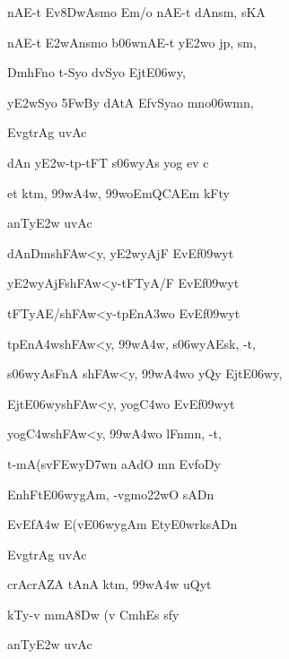 {\dn nAE-t Ev\38DwAsmo Em/o nAE-t dAnsm, sKA{\dandabdn} \dontdisplaylinenum}

{\dn nAE-t \3E2wAnsmo b\306wnA\0E-t y\3E2wo jp, sm, \vegdn\dontdisplaylinenum}

{\dn Dm\0hFno t-Syo d\?vSyo Ejt\?E\306wy,{\dandabdn} \dontdisplaylinenum}

{\dn y\3E2wSyo \35FwBy\2 dAtA EfvSyao mno\306wmn, \vegdn\dontdisplaylinenum}

{\dn EvgtrAg uvAc{\dandabdn}\dontdisplaylinenum }

{\dn dAn y\3E2w-tp-tFT{\rdt} s\2\306wyAs\2 yog ev c{\dandadn} \dontdisplaylinenum}

{\dn et\? ktm, \399w\?\3A4w, \399woEmQCAEm kFt\0y \vegdn\dontdisplaylinenum}

{\dn anT\0y\3E2w uvAc{\dandabdn}\dontdisplaylinenum }

{\dn dAnDm\0sh\3FAw\?<y, y\3E2wyAjF EvEf\309wyt\?{\dandadn} \dontdisplaylinenum}

{\dn y\3E2wyAjFsh\3FAw\?<y-tFT\0yA/F EvEf\309wyt\? \vegdn\dontdisplaylinenum}

{\dn tFT\0yAE/sh\3FAw\?<y-tpEn\3A3wo EvEf\309wyt\?{\dandabdn} \dontdisplaylinenum}

{\dn tpEn\3A4wsh\3FAw\?<y, \399w\?\3A4w, s\2\306wyAEsk, -t, \vegdn\dontdisplaylinenum}

{\dn s\2\306wyAsFnA\2 sh\3FAw\?<y, \399w\?\3A4wo yQy Ejt\?E\306wy,{\dandabdn} \dontdisplaylinenum}

{\dn Ejt\?E\306wysh\3FAw\?<y, yog\3C4wo EvEf\309wyt\? \vegdn\dontdisplaylinenum}

{\dn yog\3C4wsh\3FAw\?<y, \399w\?\3A4wo lFnmn, -t,{\dandabdn} \dontdisplaylinenum}

{\dn t-mA(sv\0\3FEwy\3D7w\?n aAdO mn EvfoDy\? \vegdn\dontdisplaylinenum}

{\dn EnhFt\?E\306wyg\5Am, -vg\0mo\322wO  sADn \dontdisplaylinenum}

{\dn EvEf\3A4w\? E(vE\306wyg\5Am\? Ety\0\3E0wrksADn \vegdn\dontdisplaylinenum}

{\dn EvgtrAg uvAc{\dandabdn}\dontdisplaylinenum }

{\dn crAcrAZA\2 tAnA\2 ktm, \399w\?\3A4w uQyt\?{\dandadn} \dontdisplaylinenum}

{\dn kTy-v mmA\38Dw (v\2 C\?mh\0Es s\2fy \vegdn\dontdisplaylinenum}

{\dn anT\0y\3E2w uvAc{\dandabdn}\dontdisplaylinenum }

